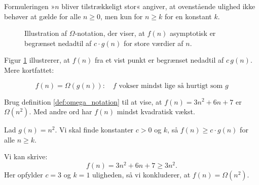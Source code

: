Formuleringen »$n$ bliver tilstrækkeligt stor« angiver, at ovenstående ulighed ikke behøver at gælde for alle $n \geq 0$, men kun for $n \geq k$ for en konstant $k$. 

\begin{figure}[htbp]
    \centering
    \caption{Illustration af \(\Omega\)-notation, der viser, at $f(n)$ asymptotisk er begrænset nedadtil af $c \cdot g(n)$ for store værdier af $n$.}
    \label{fig:omega_notation}
\end{figure}

Figur \ref{fig:omega_notation} illustrerer, at $f(n)$ fra et vist punkt er begrænset nedadtil af $c\,g(n)$. Mere kortfattet:

\[
f(n)=\Omega(g(n)): \quad f \text{ vokser mindst lige så hurtigt som } g
\]


\begin{example}
    Brug definition \ref{def:omega_notation} til at vise, at $f(n)=3n^2+6n+7$ er $\Omega(n^2)$. Med andre ord har $f(n)$ mindst kvadratisk vækst.
\end{example}

\begin{solution}
    Lad $g(n) = n^2$. Vi skal finde konstanter $c > 0$ og $k$, så $f(n) \geq c \cdot g(n)$ for alle $n \geq k$.

    Vi kan skrive:
    \[
    f(n) = 3n^2 + 6n + 7 \geq 3n^2.
    \]
    Her opfylder $c = 3$ og $k = 1$ uligheden, så vi konkluderer, at $f(n) = \Omega(n^2)$.
\end{solution}


